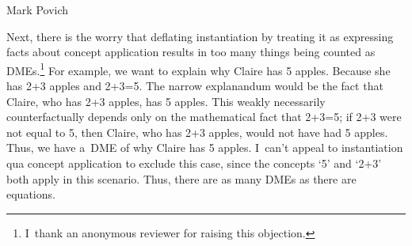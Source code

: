 \begin{artengenv}{Mark Povich}
{Next, there is the worry that deflating instantiation by treating it as expressing facts about concept application results in too many things being counted as DMEs.\footnote{I~thank an anonymous reviewer for raising this objection.}
 For example, we want to explain why Claire has 5 apples. Because she has 2+3 apples and 2+3=5. The narrow explanandum would be the fact that Claire, who has 2+3 apples, has 5 apples. This weakly necessarily counterfactually depends only on the mathematical fact that 2+3=5; if 2+3 were not equal to 5, then Claire, who has 2+3 apples, would not have had 5 apples. Thus, we have a~DME of why Claire has 5 apples. I~can't appeal to instantiation qua concept application to exclude this case, since the concepts ‘5' and ‘2+3' both apply in this scenario. Thus, there are as many DMEs as there are equations.


}
\end{artengenv}
